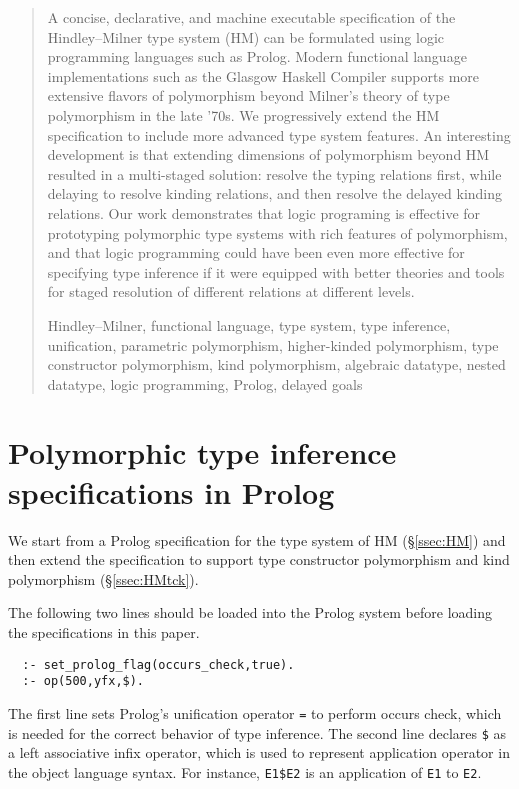 \documentclass[runningheads,a4paper]{llncs}
\newcommand{\keywords}[1]{\par\addvspace\baselineskip
\noindent\keywordname\enspace\ignorespaces#1}
\begin{document}
\begin{abstract}
A concise, declarative, and machine executable specification of
the Hindley--Milner type system (HM) can be formulated using
logic programming languages such as Prolog. Modern functional
language implementations such as the Glasgow Haskell Compiler
supports more extensive flavors of polymorphism beyond Milner's
theory of type polymorphism in the late '70s. We progressively extend
the HM specification to include more advanced type system features.
An interesting development is that extending dimensions of polymorphism
beyond HM resulted in a multi-staged solution: resolve the typing relations
first, while delaying to resolve kinding relations, and then resolve
the delayed kinding relations. Our work demonstrates that logic programing
is effective for prototyping polymorphic type systems with rich features of
polymorphism, and that logic programming could have been even more effective
for specifying type inference if it were equipped with better theories and
tools for staged resolution of different relations at different levels.
\keywords{Hindley--Milner, functional language, type system,
  type inference, unification, parametric polymorphism,
  higher-kinded polymorphism, type constructor polymorphism,
  kind polymorphism, algebraic datatype, nested datatype,
  logic programming, Prolog, delayed goals
        }
\end{abstract}



\section{Polymorphic type inference specifications in Prolog}
\label{sec:poly}
We start from a Prolog specification for the type system of
HM (\S\ref{ssec:HM}) and then extend the specification to support
type constructor polymorphism and kind polymorphism (\S\ref{ssec:HMtck}).

The following two lines should be loaded into the Prolog system
before loading the specifications in this paper. {\small\vspace*{-1ex}
\begin{verbatim}
  :- set_prolog_flag(occurs_check,true).
  :- op(500,yfx,$).
\end{verbatim} \vspace*{-.7ex} }\noindent
The first line sets Prolog's unification operator \verb|=| to perform
occurs check, which is needed for the correct behavior of type inference.
The second line declares \verb|$| as a left associative infix operator,
which is used to represent application operator in the object language syntax.
For instance, {\small\verb|E1$E2|} is an application of
{\small\verb|E1|} to {\small\verb|E2|}.
\end{document}
